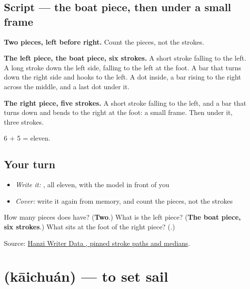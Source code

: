 \subsection*{Script — the boat piece, then  under a small frame}

\begin{quote}
\end{quote}

\textbf{Two pieces, left before right.} Count the pieces, not the strokes.

\textbf{The left piece, the boat piece, six strokes.} A short stroke falling to the left. A long stroke down the left side, falling to the left at the foot. A bar that turns down the right side and hooks to the left. A dot inside, a bar rising to the right across the middle, and a last dot under it.

\textbf{The right piece, five strokes.} A short stroke falling to the left, and a bar that turns down and bends to the right at the foot: a small frame. Then  under it, three strokes.

6 + 5 = eleven.

\subsection*{Your turn}
\begin{itemize}
\raggedright
  \item \emph{Write it:} , all eleven, with the model in front of you
  \item \emph{Cover:} write it again from memory, and count the pieces, not the strokes
\end{itemize}

\begin{tcolorbox}[breakable,colback=teal!4,colframe=teal!35!black,title={Before you move on}]
How many pieces does  have? (\textbf{Two}.) What is the left piece? (\textbf{The boat piece, six strokes}.) What sits at the foot of the right piece? (\textbf{}.)

Source: \href{https://raw.githubusercontent.com/chanind/hanzi-writer-data/68d10a4b21150cae5e1ebbd223eed289cf32d90c/data/\%E8\%88\%B9.json}{Hanzi Writer Data , pinned stroke paths and medians}.
\end{tcolorbox}
\section[\texorpdfstring{\zh{开船} (kāichuán)}{开船 (kāichuán)}]{ (kāichuán) — to set sail}


